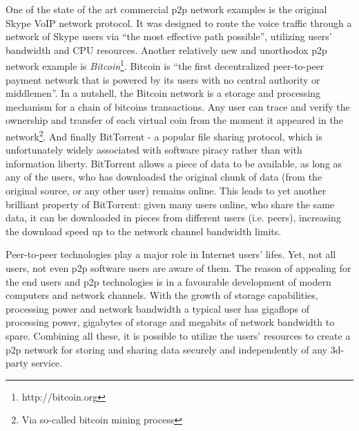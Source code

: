 One of the state of the art commercial p2p network examples is the
original Skype VoIP network protocol. It was designed to route the
voice traffic through a network of Skype users via
``the most effective path possible''\cite{skype-p2p}, utilizing
users' bandwidth and CPU resources.
Another relatively new and unorthodox p2p network example is
\emph{Bitcoin}\footnote{http://bitcoin.org}. Bitcoin is
``the first decentralized peer-to-peer payment network that
is powered by its users with no central authority or middlemen''.
In a nutshell, the Bitcoin network is a storage and processing
mechanism for a chain of bitcoins transactions. Any user can
trace and verify the ownership and transfer of each virtual
coin from the moment it appeared in the network\footnote{Via
so-called bitcoin mining process}.
And finally BitTorrent - a popular file sharing protocol, which is
unfortunately widely associated with software piracy rather than
with information liberty. BitTorrent allows a piece of data to be
available, as long as any of the users, who has downloaded the original
chunk of data (from the original source, or any other user) remains
online. This leads to yet another brilliant property of BitTorrent:
given many users online, who share the same data, it can be downloaded
in pieces from different users (i.e. peers), increasing the download
speed up to the network channel bandwidth limits.

Peer-to-peer technologies play a major role in Internet users' lifes.
Yet, not all users, not even p2p software users are aware of them.
The reason of appealing for the end users and p2p technologies
is in a favourable development of modern computers and network channels.
With the growth of storage capabilities, processing power and network
bandwidth a typical user has gigaflops of processing power, gigabytes
of storage and megabits of network bandwidth to spare. Combining all
these, it is possible to utilize the users' resources to create a
p2p network for storing and sharing data securely and independently
of any 3d-party service.
